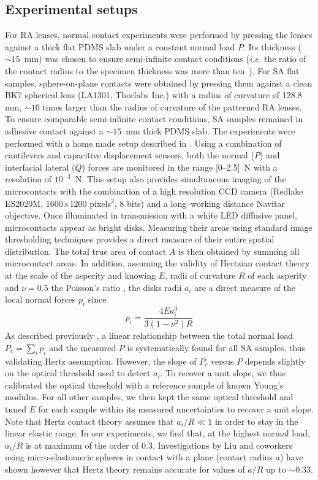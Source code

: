 \documentclass[pre,groupedaddress,showkeys,showpacs,twocolumn]{revtex4}
\begin{document}
\subsection*{Experimental setups}
%
\indent For RA lenses, normal contact experiments were performed by pressing the lenses against a thick flat PDMS slab under a constant normal load $P$. Its thickness ($\sim15$~mm) was chosen to ensure semi-infinite contact conditions (\textit{i.e.} the ratio of the contact radius to the specimen thickness was more than ten~\cite{Gacoin2006}). For SA flat samples, sphere-on-plane contacts were obtained by pressing them against a clean BK7 spherical lens (LA1301, Thorlabs Inc.) with a radius of curvature of 128.8 mm, $\sim 10$ times larger than the radius of curvature of the patterned RA lenses. To ensure comparable semi-infinite contact conditions, SA samples remained in adhesive contact against a $\sim15$~mm thick PDMS slab. The experiments were performed with  a home made setup described in \cite{prevost2013,Romero2013}. Using a combination of cantilevers and capacitive displacement sensors, both the normal ($P$) and interfacial lateral ($Q$) forces are monitored in the range [0--2.5]~N with a resolution 
of $10^{-3}$~N. This setup also provides simultaneous imaging of the microcontacts with the combination of a high resolution CCD camera (Redlake ES2020M, 1600$\times$1200 pixels$^2$, 8 bits) and a long--working distance Navitar objective. Once illuminated in transmission with a white LED diffusive panel, microcontacts appear as bright disks. Measuring their areas using standard image thresholding techniques provides a direct measure of their entire spatial distribution. The total true area of contact $A$ is then obtained by summing all microcontact areas. In addition, assuming the validity of Hertzian contact theory at the scale of the asperity and knowing $E$, radii of curvature $R$ of each asperity and $\nu=0.5$ the Poisson's ratio \cite{prevost2013,Romero2013}, the disks radii $a_i$ are a direct measure of the local normal forces $p_i$ since
%
\begin{equation}
	p_i=\frac{4 E a_i^3}{3 (1-\nu^2) R} 
	\label{EqHertz}	
\end{equation}
%
As described previously \cite{Romero2013}, a linear relationship between the total normal load $P_c=\sum_{i} p_i$ and the measured $P$ is systematically found for all SA samples, thus validating Hertz assumption. However, the slope of $P_c$ versus $P$ depends slightly on the optical threshold used to detect $a_i$. To recover a unit slope, we thus calibrated the optical threshold with a reference sample of known Young's modulus. For all other samples, we then kept the same optical threshold and tuned $E$ for each sample within its measured uncertainties to recover a unit slope. Note that Hertz contact theory assumes that $a_i/R \ll 1$ in order to stay in the linear elastic range. In our experiments, we find that, at the highest normal load, $a_i/R$ is at maximum of the order of $0.3$. Investigations by Liu and coworkers~\cite{Briscoe1998} using micro-elastomeric spheres in contact with a plane (contact radius $a$) have shown however that Hertz theory remains accurate for values of $a/R$ up to $\sim 0.33$.\\
\end{document}
